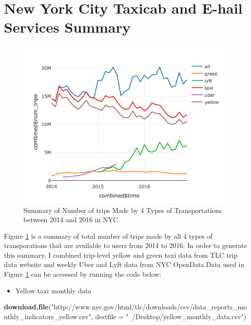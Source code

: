 \documentclass[12pt,twoside]{reedthesis}
\newenvironment{Shaded}{\begin{snugshade}}{\end{snugshade}}
\newcommand{\KeywordTok}[1]{\textcolor[rgb]{0.13,0.29,0.53}{\textbf{#1}}}
\newcommand{\DataTypeTok}[1]{\textcolor[rgb]{0.13,0.29,0.53}{#1}}
\newcommand{\StringTok}[1]{\textcolor[rgb]{0.31,0.60,0.02}{#1}}
\newcommand{\NormalTok}[1]{#1}
\providecommand{\tightlist}{%
  \setlength{\itemsep}{0pt}\setlength{\parskip}{0pt}}
\theoremstyle{definition}
\theoremstyle{definition}
\theoremstyle{definition}
\theoremstyle{remark}
\begin{document}
\section{New York City Taxicab and E-hail Services
Summary}\label{new-york-city-taxicab-and-e-hail-services-summary}
\begin{figure}

{\centering \includegraphics[width=5.75in]{figure/Num_trips_summary} 

}

\caption{Summary of Number of trips Made by 4 Types of Transportations between 2014 and 2016 in NYC}\label{fig:num-trips-summary}
\end{figure}
Figure \ref{fig:num-trips-summary} is a summary of total number of trips
made by all 4 types of transporations that are available to users from
2014 to 2016. In order to generate this summary, I combined trip-level
yellow and green taxi data from TLC trip data website and weekly Uber
and Lyft data from NYC OpenData.Data used in Figure
\ref{fig:num-trips-summary} can be accessed by running the code below:
\begin{itemize}
\tightlist
\item
  Yellow taxi monthly data
\end{itemize}
\begin{Shaded}
\begin{Highlighting}[]
\KeywordTok{download.file}\NormalTok{(}\StringTok{"http://www.nyc.gov/html/tlc/downloads/csv/data_reports_monthly_indicators_yellow.csv"}\NormalTok{, }\DataTypeTok{destfile =} \StringTok{"~/Desktop/yellow_monthly_data.csv"}\NormalTok{)}
\end{Highlighting}
\end{Shaded}
\end{document}
